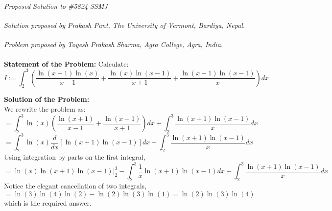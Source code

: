 \documentclass[12pt]{article}
\begin{document}
\textit{Proposed Solution to \#5824 SSMJ }\\ \\
\textit{Solution proposed by Prakash Pant, The University of Vermont, Bardiya, Nepal.}\\ \\
\textit{Problem proposed by Toyesh Prakash Sharma, Agra College, Agra, India.
} \\ \\
\textbf{Statement of the Problem:}
Calculate:
\[ I:= \int_2^3 \left(\frac{\ln(x+1)\ln(x)}{x-1} + \frac{\ln(x) \ln(x-1)}{x+1} + \frac{\ln(x+1) \ln(x-1)}{x} \right) dx \]



\textbf{Solution of the Problem:} \\
We rewrite the problem as: 
\[= \int_2^3 \ln(x) \left( \frac{\ln(x+1)}{x-1} + \frac{\ln(x-1)}{x+1} \right) dx + \int_2^3 \frac{\ln(x+1)\ln(x-1)}{x} dx\]
\[= \int_2^3 \ln(x) \frac{d}{dx}\left[ \ln(x+1)\ln(x-1)\right] dx  + \int_2^3 \frac{\ln(x+1)\ln(x-1)}{x} dx \]
Using integration by parts on the first integral, 
\[= \ln(x) \ln(x+1) \ln(x-1) \big|_2^3 - \int_2^3 \frac{1}{x} \ln(x+1) \ln(x-1) dx + \int_2^3 \frac{\ln(x+1)\ln(x-1)}{x} dx
\]
Notice the elegant cancellation of two integrals, 
\[= \ln(3) \ln(4) \ln(2) - \ln(2) \ln(3) \ln(1)  = \ln(2) \ln(3) \ln(4)\]
which is the required answer. 




 
\end{document}
